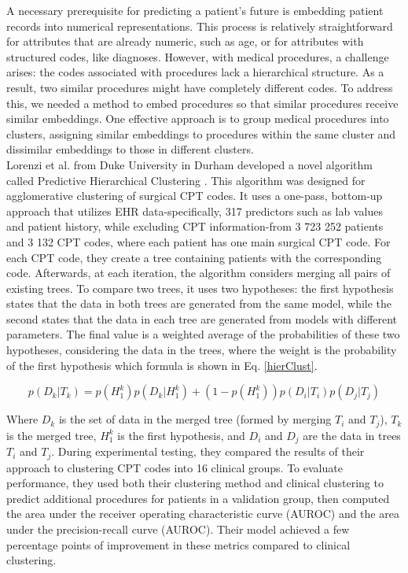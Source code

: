 
A necessary prerequisite for predicting a patient’s future is embedding patient records into numerical representations. This process is relatively straightforward for attributes that are already numeric, such as age, or for attributes with structured codes, like diagnoses. However, with medical procedures, a challenge arises: the codes associated with procedures lack a hierarchical structure. As a result, two similar procedures might have completely different codes. To address this, we needed a method to embed procedures so that similar procedures receive similar embeddings. One effective approach is to group medical procedures into clusters, assigning similar embeddings to procedures within the same cluster and dissimilar embeddings to those in different clusters.
\\

Lorenzi et al. from Duke University in Durham developed a novel algorithm called Predictive Hierarchical Clustering \cite{lorenzi2017predictive}. This algorithm was designed for agglomerative clustering of surgical CPT codes. It uses a one-pass, bottom-up approach that utilizes EHR data-specifically, 317 predictors such as lab values and patient history, while excluding CPT information-from 3 723 252 patients and 3 132 CPT codes, where each patient has one main surgical CPT code. For each CPT code, they create a tree containing patients with the corresponding code. Afterwards, at each iteration, the algorithm considers merging all pairs of existing trees. To compare two trees, it uses two hypotheses: the first hypothesis states that the data in both trees are generated from the same model, while the second states that the data in each tree are generated from models with different parameters. The final value is a weighted average of the probabilities of these two hypotheses, considering the data in the trees, where the weight is the probability of the first hypothesis which formula is shown in Eq. \ref{hierClust}.

\begin{equation}
	\label{hierClust}
	p(D_k \vert T_k) = p(H_1^k)p(D_k \vert H_1^k) + (1 - p(H_1^k))p(D_i \vert T_i)p(D_j \vert T_j)
\end{equation} 

Where $D_k$ is the set of data in the merged tree (formed by merging $T_i$ and $T_j$), $T_k$ is the merged tree, $H_1^k$ is the first hypothesis, and $D_i$ and $D_j$ are the data in trees $T_i$ and $T_j$. During experimental testing, they compared the results of their approach to clustering CPT codes into 16 clinical groups. To evaluate performance, they used both their clustering method and clinical clustering to predict additional procedures for patients in a validation group, then computed the area under the receiver operating characteristic curve (AUROC) and the area under the precision-recall curve (AUROC). Their model achieved a few percentage points of improvement in these metrics compared to clinical clustering.
\\

